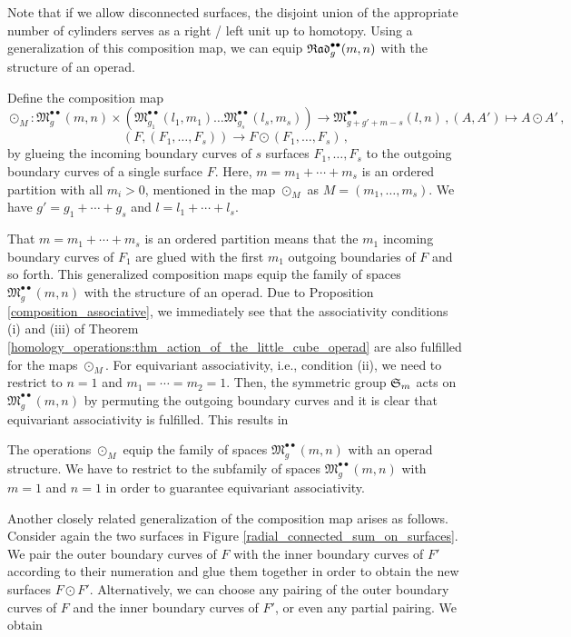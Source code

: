 Note that if we allow disconnected surfaces, the disjoint union of the appropriate number of cylinders serves as a right / left unit up to homotopy. 
Using a generalization of this composition map, we can equip $\mathfrak{Rad}^{\bullet \bullet}_g(m, n)$ with the structure of an operad.

\begin{defi}
   Define the composition map 
   \[
      \odot_M \colon \mathfrak M^{\bullet \bullet}_g(m, n) \times \left( \mathfrak M^{\bullet \bullet}_{g_1}(l_1, m_1) \dots \mathfrak M^{\bullet \bullet}_{g_s}(l_s, m_s)\right) \to \mathfrak M^{\bullet \bullet}_{g + g' + m - s}(l, n)\,, (A, A') \mapsto A \odot A'\,,
   \]
   \[
       (F, (F_1, \dotsc, F_s)) \to F \odot (F_1, \dotsc, F_s)\,,
   \]
   by glueing the incoming boundary curves of $s$ surfaces $F_1, \dotsc, F_s$ to the outgoing boundary curves of a single surface $F$. 
   Here, $m = m_1 + \dotsb + m_s$ is an ordered partition with all $m_i > 0$, mentioned in the map $\odot_M$ as $M = (m_1, \dotsc, m_s)$.
   We have $g' = g_1 + \dotsb + g_s$ and $l = l_1 + \dotsb + l_s$.  
\end{defi}

That $m = m_1 + \dotsb + m_s$ is an ordered partition means that the $m_1$ incoming boundary curves of $F_1$ are glued with the first $m_1$ outgoing boundaries of $F$ and so forth.
This generalized composition maps equip the family of spaces $\mathfrak M^{\bullet \bullet}_g(m, n)$ with the structure of an operad.
Due to Proposition \ref{composition_associative}, we immediately see that the associativity conditions (i) and (iii) of Theorem \ref{homology_operations:thm_action_of_the_little_cube_operad} are also fulfilled for the maps $\odot_M$.
For equivariant associativity, i.e., condition (ii), we need to restrict to $n = 1$ and $m_1 = \dotsb = m_2 = 1$. 
Then, the symmetric group $\mathfrak S_m$ acts on $\mathfrak M^{\bullet \bullet}_g(m, n)$ by permuting the outgoing boundary curves
and it is clear that equivariant associativity is fulfilled.
This results in

\begin{prop}
The operations $\odot_M$ equip the family of spaces $\mathfrak M^{\bullet \bullet}_g(m, n)$ with an operad structure.
We have to restrict to the subfamily of spaces $\mathfrak M^{\bullet \bullet}_g(m, n)$ with $m = 1$ and $n = 1$ in order to guarantee equivariant associativity.
\end{prop}

Another closely related generalization of the composition map arises as follows.
Consider again the two surfaces in Figure \ref{radial_connected_sum_on_surfaces}.
We pair the outer boundary curves of $F$ with the inner boundary curves of $F'$ according to their numeration and glue them together in order to obtain the new surfaces $F \odot F'$.
Alternatively, we can choose any pairing of the outer boundary curves of $F$ and the inner boundary curves of $F'$, or even any partial pairing.
We obtain

